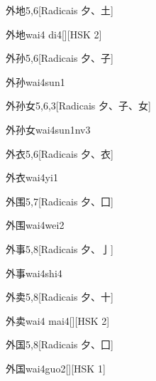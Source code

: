 \begin{entry}{外地}{5,6}[Radicais ⼣、⼟]
  \begin{phonetics}{外地}{wai4 di4}[][HSK 2]
  \end{phonetics}
\end{entry}

\begin{entry}{外孙}{5,6}[Radicais ⼣、⼦]
  \begin{phonetics}{外孙}{wai4sun1}
  \end{phonetics}
\end{entry}

\begin{entry}{外孙女}{5,6,3}[Radicais ⼣、⼦、⼥]
  \begin{phonetics}{外孙女}{wai4sun1nv3}
  \end{phonetics}
\end{entry}

\begin{entry}{外衣}{5,6}[Radicais ⼣、⾐]
  \begin{phonetics}{外衣}{wai4yi1}
  \end{phonetics}
\end{entry}

\begin{entry}{外围}{5,7}[Radicais ⼣、⼞]
  \begin{phonetics}{外围}{wai4wei2}
  \end{phonetics}
\end{entry}

\begin{entry}{外事}{5,8}[Radicais ⼣、⼅]
  \begin{phonetics}{外事}{wai4shi4}
  \end{phonetics}
\end{entry}

\begin{entry}{外卖}{5,8}[Radicais ⼣、⼗]
  \begin{phonetics}{外卖}{wai4 mai4}[][HSK 2]
  \end{phonetics}
\end{entry}

\begin{entry}{外国}{5,8}[Radicais ⼣、⼞]
  \begin{phonetics}{外国}{wai4guo2}[][HSK 1]
  \end{phonetics}
\end{entry}

